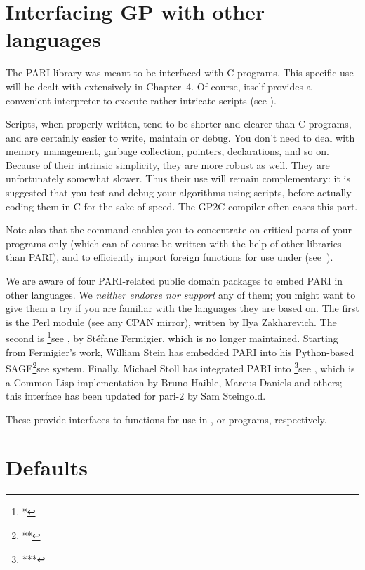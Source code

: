 \section{Interfacing GP with other languages}
\noindent
The PARI library was meant to be interfaced with C programs. This specific
use will be dealt with extensively in Chapter~4. Of course,  itself
provides a convenient  interpreter to execute rather intricate scripts (see
).

Scripts, when properly written, tend to be shorter and clearer than C
programs, and are certainly easier to write, maintain or debug. You don't
need to deal with memory management, garbage collection, pointers,
declarations, and so on. Because of their intrinsic simplicity, they are more
robust as well. They are unfortunately somewhat slower. Thus their use will
remain complementary: it is suggested that you test and debug your algorithms
using scripts, before actually coding them in C for the sake of speed.
The GP2C compiler often eases this part.

Note also that the  command enables you to concentrate on
critical parts of your programs only (which can of course be written with the
help of other libraries than PARI), and to efficiently import
foreign functions for use under  (see~).

We are aware of four PARI-related public domain packages to embed PARI in
other languages. We \emph{neither endorse nor support} any of them; you might
want to give them a try if you are familiar with the languages they are based
on. The first is the  Perl module (see any CPAN mirror),
written by Ilya Zakharevich. The second is %
\footnote{*}{see },
%
by St\'efane Fermigier, which is no longer maintained. Starting from
Fermigier's work, William Stein has embedded PARI into his Python-based
SAGE\footnote{**}{see }
system. Finally, Michael Stoll has integrated PARI into 
\footnote{***}{see }, which is a Common Lisp
implementation by Bruno Haible, Marcus Daniels and others; this interface has
been updated for pari-2 by Sam Steingold.

These provide interfaces to  functions for use in ,
 or  programs,
respectively.

\section{Defaults}
\label{se:defaults}

